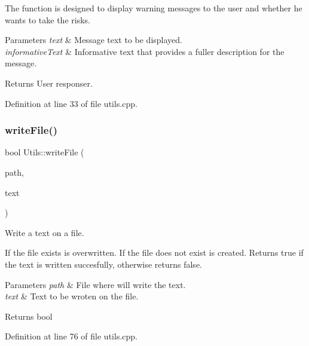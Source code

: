 The function is designed to display warning messages to the user and whether he wants to take the risks. 
\begin{DoxyParams}{Parameters}
{\em text} & Message text to be displayed. \\
\hline
{\em informative\+Text} & Informative text that provides a fuller description for the message. \\
\hline
\end{DoxyParams}
\begin{DoxyReturn}{Returns}
User responser. 
\end{DoxyReturn}


Definition at line 33 of file utils.\+cpp.

\mbox{\label{classUtils_ae41ebd024526737fbaaada06e229b3c5}} 
\subsubsection{\texorpdfstring{write\+File()}{writeFile()}}
{\footnotesize\ttfamily bool Utils\+::write\+File (\begin{DoxyParamCaption}\item[{const Q\+String \&}]{path,  }\item[{const Q\+String \&}]{text }\end{DoxyParamCaption})\hspace{0.3cm}{\ttfamily [static]}}



Write a text on a file. 

If the file exists is overwritten. If the file does not exist is created. Returns true if the text is written succesfully, otherwise returns false. 
\begin{DoxyParams}{Parameters}
{\em path} & File where will write the text. \\
\hline
{\em text} & Text to be wroten on the file. \\
\hline
\end{DoxyParams}
\begin{DoxyReturn}{Returns}
bool 
\end{DoxyReturn}


Definition at line 76 of file utils.\+cpp.

\mbox{\label{classUtils_ad33c4bda97a81483e4b34e692e747d0b}} 
